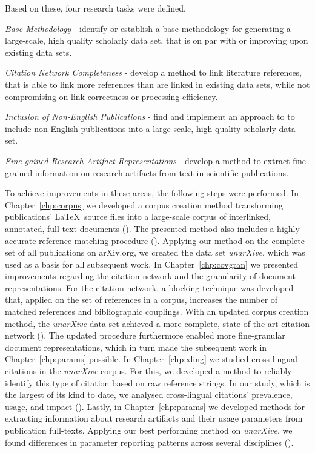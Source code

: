 Based on these, four research tasks were defined.

\begin{rtlist}
    \item \textit{Base Methodology} - identify or establish a base methodology for generating a large-scale, high quality scholarly data set, that is on par with or improving upon existing data sets.
    \item \textit{Citation Network Completeness} - develop a method to link literature references, that is able to link more references than are linked in existing data sets, while not compromising on link correctness or processing efficiency.
    \item \textit{Inclusion of Non-English Publications} - find and implement an approach to to include non-English publications into a large-scale, high quality scholarly data set.
    \item \textit{Fine-gained Research Artifact Representations} - develop a method to extract fine-grained information on research artifacts from text in scientific publications.
\end{rtlist}

To achieve improvements in these areas, the following steps were performed. In Chapter~\ref{chp:corpus} we developed a corpus creation method transforming publications' \LaTeX\ source files into a large-scale corpus of interlinked, annotated, full-text documents (). The presented method also includes a highly accurate reference matching procedure (). Applying our method on the complete set of all publications on arXiv.org, we created the data set \emph{unarXive}, which was used as a basis for all subsequent work. %
In Chapter~\ref{chp:covgran} we presented improvements regarding the citation network and the granularity of document representations. For the citation network, a blocking technique was developed that, applied on the set of references in a corpus, increases the number of matched references and bibliographic couplings. With an updated corpus creation method, the \emph{unarXive} data set achieved a more complete, state-of-the-art citation network (). The updated procedure furthermore enabled more fine-granular document representations, which in turn made the subsequent work in Chapter~\ref{chp:params} possible. %
In Chapter~\ref{chp:xling} we studied cross-lingual citations in the \emph{unarXive} corpus. For this, we developed a method to reliably identify this type of citation based on raw reference strings. In our study, which is the largest of its kind to date, we analysed cross-lingual citations' prevalence, usage, and impact (). %
Lastly, in Chapter~\ref{chp:params} we developed methods for extracting information about research artifacts and their usage parameters from publication full-texts. Applying our best performing method on \emph{unarXive}, we found differences in parameter reporting patterns across several disciplines (). %


